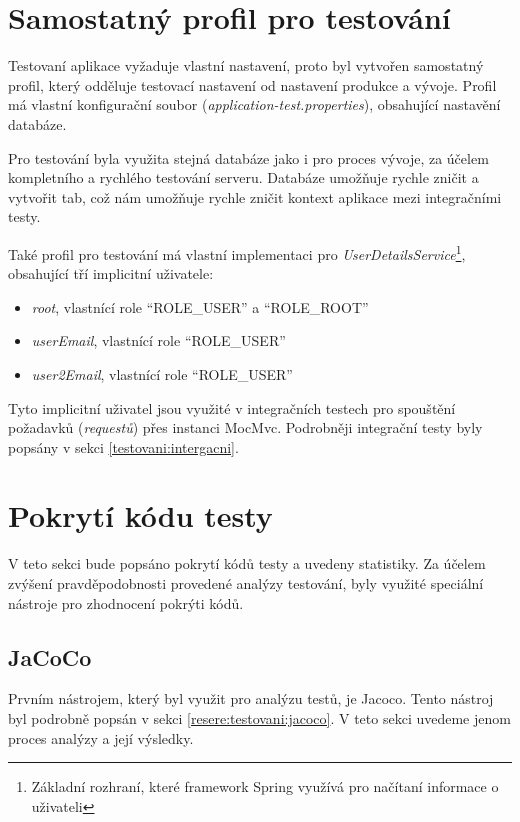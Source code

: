 \section{Samostatný profil pro testování}
    Testovaní aplikace vyžaduje vlastní nastavení, proto byl vytvořen samostatný profil, který odděluje testovací nastavení od nastavení produkce a vývoje. Profil má vlastní konfigurační soubor (\textit{application-test.properties}), obsahující nastavění databáze.
    
    Pro testování byla  využita stejná databáze jako i pro proces vývoje, za účelem kompletního a rychlého testování serveru. Databáze umožňuje rychle zničit a vytvořit tab, což nám umožňuje rychle zničit kontext aplikace mezi integračními testy.
    
    Také profil pro testování má vlastní implementaci pro \textit{UserDetailsService}\footnote{Základní rozhraní, které framework Spring využívá pro načítaní informace o uživateli}, obsahující tří implicitní uživatele:
    \begin{itemize}
            \item \textit{root}, vlastnící role \enquote{ROLE\_USER} a \enquote{ROLE\_ROOT} 
            \item \textit{userEmail}, vlastnící role \enquote{ROLE\_USER}
            \item \textit{user2Email}, vlastnící role \enquote{ROLE\_USER}
        \end{itemize}
    Tyto implicitní uživatel jsou využité v integračních testech pro spouštění požadavků (\textit{requestů}) přes instanci MocMvc. Podrobněji integrační testy byly popsány v sekci \ref{testovani:intergacni}.
\section{Pokrytí kódu testy}\label{testovani:pokryti}
    V teto sekci bude popsáno pokrytí kódů testy a uvedeny statistiky. Za účelem zvýšení pravděpodobnosti provedené analýzy testování, byly využité speciální nástroje pro zhodnocení pokrýti kódů.
    \subsection{JaCoCo}
    Prvním nástrojem, který byl využit pro analýzu testů, je Jacoco. Tento nástroj byl podrobně popsán v sekci \ref{resere:testovani:jacoco}. V teto sekci uvedeme jenom proces analýzy a její výsledky.
    
